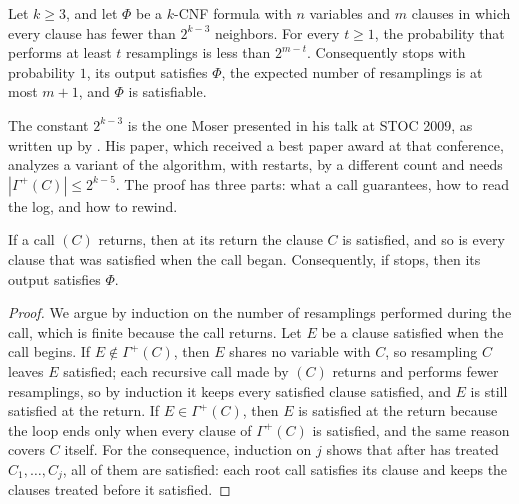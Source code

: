 \begin{refsection}
\begin{theorem}\label{thm:compression:moser}
Let $k\ge3$, and let $\Phi$ be a $k$-CNF formula with $n$ variables and $m$ clauses in which every clause has fewer than $2^{k-3}$ neighbors. For every $t\ge1$, the probability that \compressionSolve{} performs at least $t$ resamplings is less than $2^{m-t}$. Consequently \compressionSolve{} stops with probability $1$, its output satisfies $\Phi$, the expected number of resamplings is at most $m+1$, and $\Phi$ is satisfiable.
\end{theorem}

The constant $2^{k-3}$ is the one Moser presented in his talk at STOC 2009, as written up by \textcite{Fortnow2009}. His paper, which received a best paper award at that conference, analyzes a variant of the algorithm, with restarts, by a different count and needs $|\Gamma^+(C)|\le2^{k-5}$. The proof has three parts: what a call guarantees, how to read the log, and how to rewind.

\begin{lemma}\label{lem:compression:invariant}
If a call \compressionFix$(C)$ returns, then at its return the clause $C$ is satisfied, and so is every clause that was satisfied when the call began. Consequently, if \compressionSolve{} stops, then its output satisfies $\Phi$.
\end{lemma}

\begin{proof}
We argue by induction on the number of resamplings performed during the call, which is finite because the call returns. Let $E$ be a clause satisfied when the call begins. If $E\notin\Gamma^+(C)$, then $E$ shares no variable with $C$, so resampling $C$ leaves $E$ satisfied; each recursive call made by \compressionFix$(C)$ returns and performs fewer resamplings, so by induction it keeps every satisfied clause satisfied, and $E$ is still satisfied at the return. If $E\in\Gamma^+(C)$, then $E$ is satisfied at the return because the loop ends only when every clause of $\Gamma^+(C)$ is satisfied, and the same reason covers $C$ itself. For the consequence, induction on $j$ shows that after \compressionSolve{} has treated $C_1,\dots,C_j$, all of them are satisfied: each root call satisfies its clause and keeps the clauses treated before it satisfied.
\end{proof}


\end{refsection}
